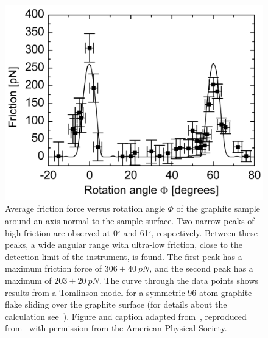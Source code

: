 \begin{figure}[!htb]
  \centering
  \includegraphics[width=0.55\linewidth]{figures/theory/graphene_rot.png}
  \caption{Average friction force versus rotation angle $\Phi$ of the
  graphite sample around an axis normal to the sample surface.
  Two narrow peaks of high friction are observed at 0$^{\circ}$ and 61$^{\circ}$,
  respectively. Between these peaks, a wide angular range with
  ultra-low friction, close to the detection limit of the instrument, is
  found. The first peak has a maximum friction force of $306 \pm \SI{40}{pN}$, and the second peak has a maximum of $203 \pm \SI{20}{pN}$.
  The curve through the data points shows results from a
  Tomlinson model for a symmetric 96-atom graphite flake
  sliding over the graphite surface (for details about the calculation see~\cite{PhysRevB.70.165418}). Figure and caption adapted from~\cite{DIENWIEBEL2005197}, reproduced from~\cite{Vanossi_2013} with permission from the American Physical Society.}
  \label{fig:graphene_rot}
\end{figure}













